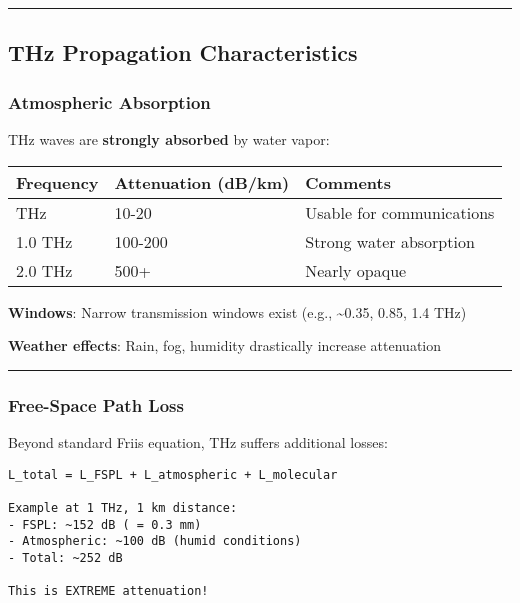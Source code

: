 \begin{center}\rule{0.5\linewidth}{0.5pt}\end{center}

\subsection{THz Propagation
Characteristics}\label{thz-propagation-characteristics}

\subsubsection{Atmospheric Absorption}\label{atmospheric-absorption}

THz waves are \textbf{strongly absorbed} by water vapor:

{\def\LTcaptype{} %
\begin{longtable}[]{@{}lll@{}}
\toprule\noalign{}
Frequency & Attenuation (dB/km) & Comments \\
\midrule\noalign{}
\endhead
\bottomrule\noalign{}
\endlastfoot
0.3 THz & 10-20 & Usable for communications \\
1.0 THz & 100-200 & Strong water absorption \\
2.0 THz & 500+ & Nearly opaque \\
\end{longtable}
}

\textbf{Windows}: Narrow transmission windows exist (e.g.,
\textasciitilde0.35, 0.85, 1.4 THz)

\textbf{Weather effects}: Rain, fog, humidity drastically increase
attenuation

\begin{center}\rule{0.5\linewidth}{0.5pt}\end{center}

\subsubsection{Free-Space Path Loss}\label{free-space-path-loss}

Beyond standard Friis equation, THz suffers additional losses:

\begin{verbatim}
L_total = L_FSPL + L_atmospheric + L_molecular

Example at 1 THz, 1 km distance:
- FSPL: ~152 dB ( = 0.3 mm)
- Atmospheric: ~100 dB (humid conditions)
- Total: ~252 dB

This is EXTREME attenuation!
\end{verbatim}

